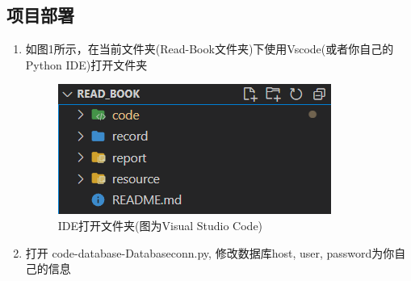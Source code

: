\documentclass[twoside,11pt]{article}
\begin{document}
\subsection{项目部署}
\begin{enumerate}
    \item 如图1所示，在当前文件夹(Read-Book文件夹)下使用Vscode(或者你自己的Python IDE)打开文件夹

          \begin{figure}[H]
              \centering
              \includegraphics[width=0.35\columnwidth]{figures/fileopen.png}
              \caption{IDE打开文件夹(图为Visual Studio Code)}
          \end{figure}
    \item 打开 code-database-Databaseconn.py, 修改数据库host, user, password为你自己的信息


\end{enumerate}
\end{document}
